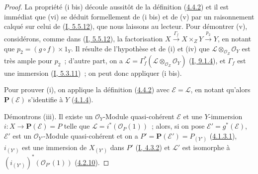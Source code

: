 \begin{proof}
La propriété (i bis) découle aussitôt de la définition
(\hyperref[II.4.4.2-fr]{4.4.2}) et il est immédiat que (vi) se déduit
formellement de (i bis) et de (v) par un raisonnement calqué sur celui de
(\hyperref[I.5.5.12-fr]{I, 5.5.12}), que nous laissons au lecteur. Pour
démontrer (v), considérons, comme dans
(\hyperref[I.5.5.12-fr]{I, 5.5.12}), la factorisation
$X\xrightarrow{\Gamma_f}X\times_ZY\xrightarrow{p_2}Y$, en notant que
$p_2=(g\circ f)\times1_Y$. Il résulte de l'hypothèse et de (i) et (iv) que
$\mathcal{L}\otimes_{\mathcal{O}_Z}\mathcal{O}_Y$ est très ample pour $p_2$~;
d'autre part, on a
$\mathcal{L}=\Gamma_f^*(\mathcal{L}\otimes_{\mathcal{O}_Z}\mathcal{O}_Y)$
(\hyperref[I.9.1.4-fr]{I, 9.1.4}), et $\Gamma_f$ est une immersion
(\hyperref[I.5.3.11-fr]{I, 5.3.11})~; on peut donc appliquer (i bis).


Pour prouver (i), on applique la définition
(\hyperref[II.4.4.2-fr]{4.4.2}) avec $\mathcal{E}=\mathcal{L}$, en notant
qu'alors $\mathbf{P}(\mathcal{E})$ s'identifie à $Y$
(\hyperref[II.4.1.4-fr]{4.1.4}).

Démontrons (iii). Il existe un $\mathcal{O}_Y$-Module quasi-cohérent
$\mathcal{E}$ et une $Y$-immersion $i:X\to\mathbf{P}(\mathcal{E})=P$ telle
que $\mathcal{L}=i^*(\mathcal{O}_P(1))$~; alors, si on pose
$\mathcal{E}'=g^*(\mathcal{E})$, $\mathcal{E}'$ est un
$\mathcal{O}_{Y'}$-Module quasi-cohérent et on a
$P'=\mathbf{P}(\mathcal{E}')=P_{(Y')}$
(\hyperref[II.4.1.3.1-fr]{4.1.3.1}), $i_{(Y')}$ est une immersion de
$X_{(Y')}$ dans $P'$ (\hyperref[I.4.3.2-fr]{I, 4.3.2}) et $\mathcal{L}'$ est
isomorphe à $(i_{(Y')})^*(\mathcal{O}_{P'}(1))$
(\hyperref[II.4.2.10-fr]{4.2.10}).


\end{proof}
